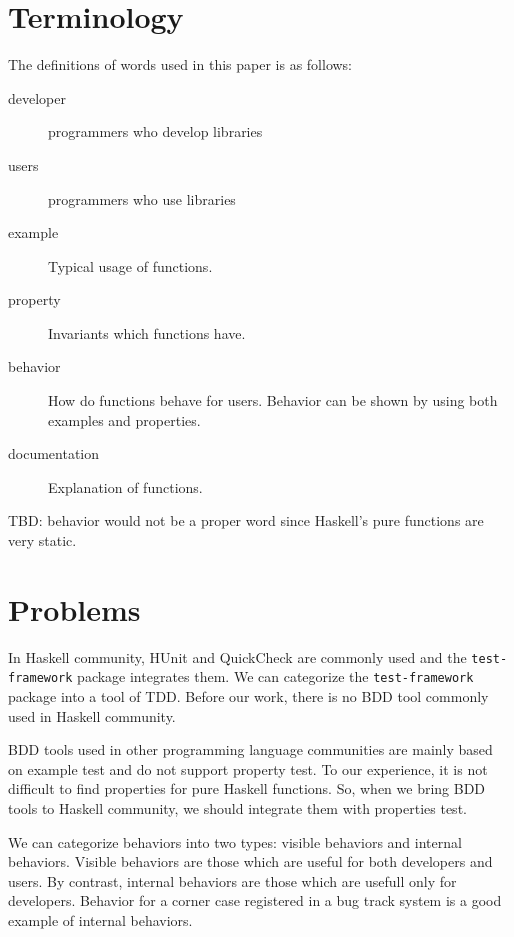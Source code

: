 \documentclass[preprint]{sigplanconf}
\begin{document}
\section{Terminology}

The definitions of words used in this paper is as follows:

\begin{description}
\item[developer] programmers who develop libraries
\item[users] programmers who use libraries
\item[example] Typical usage of functions.
\item[property] Invariants which functions have.
\item[behavior] How do functions behave for users. Behavior can be shown by using both examples and properties.
\item[documentation] Explanation of functions.
\end{description}

TBD: behavior would not be a proper word since Haskell's pure
functions are very static.

\section{Problems}

In Haskell community, HUnit and QuickCheck are commonly used %
and the {\tt test-framework} package integrates them.
We can categorize the {\tt test-framework} package into
a tool of TDD.
Before our work, there is no BDD tool commonly used in Haskell community.

BDD tools used in other programming language communities are
mainly based on example test
and do not support property test.
To our experience, it is not difficult to find properties for
pure Haskell functions.
So, when we bring BDD tools to
Haskell community, we should integrate them with properties test.

We can categorize behaviors into two types: visible behaviors
and internal behaviors.
Visible behaviors are those which are useful for both developers and users.
By contrast, internal behaviors are those which are usefull only for developers.
Behavior for a corner case registered in a bug track system is
a good example of internal behaviors.
\end{document}
